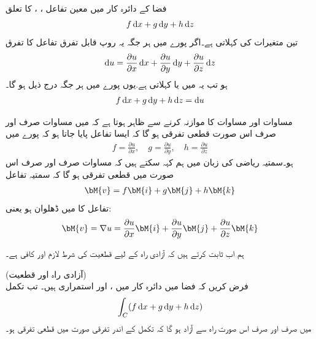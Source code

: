 فضا کے دائرہ کار  میں معین تفاعل ، ،  کا تعلق
\begin{align}\label{مساوات_خطی_تکمل_آزاد_راہ_ب}
f\dif x+g\dif y+h\dif z
\end{align}
 تین متغیرات کی  کہلاتی ہے۔اگر پورے  میں ہر جگہ  یہ روپ قابل تفرق تفاعل  کا تفرق
\begin{align}\label{مساوات_خطی_تکمل_آزاد_راہ_پ}
\dif u=\frac{\partial u}{\partial x}\dif x+\frac{\partial u}{\partial y}\dif y+\frac{\partial u}{\partial z}\dif z
\end{align}
ہو  تب یہ  میں  یا  کہلاتی ہے.یوں پورے  میں ہر جگہ درج ذیل ہو گا۔
\begin{align}\label{مساوات_خطی_تکمل_آزاد_راہ_ت}
f\dif x+g\dif y+h\dif z=\dif u
\end{align}

مساوات  اور مساوات  کا موازنہ کرنے سے ظاہر ہوتا ہے کہ  میں مساوات  صرف اور صرف اس صورت قطعی تفرقی ہو گا کہ ایسا تفاعل  پایا جاتا ہو کہ پورے  میں
\begin{align}\label{مساوات_خطی_تکمل_آزاد_راہ_ٹ}
f=\frac{\partial u}{\partial x},\quad g=\frac{\partial u}{\partial y},\quad h=\frac{\partial u}{\partial z}
\end{align}
ہو۔سمتیہ ریاضی کی زبان میں ہم کہہ سکتے ہیں کہ مساوات  صرف اور صرف اس صورت  میں قطعی تفرقی ہو گا کہ سمتیہ  تفاعل
\begin{align*}
\bM{v}=f\bM{i}+g\bM{j}+h\bM{k}
\end{align*}
تفاعل  کا  میں ڈھلوان ہو یعنی:
\begin{align}\label{مساوات_خطی_تکمل_آزاد_راہ_ث}
\bM{v}=\nabla u=\frac{\partial u}{\partial x}\bM{i}+\frac{\partial u}{\partial y}\bM{j}+\frac{\partial u}{\partial z}\bM{k}
\end{align}

ہم اب ثابت کرتے ہیں کہ آزادی راہ کے لیے  قطعیت کی شرط لازم اور کافی ہے۔

\quad (آزادی راہ اور قطعیت)\\
فرض کریں کہ فضا میں دائرہ کار  میں ،  اور   استمراری ہیں۔ تب تکمل
\begin{align}\label{مساوات_خطی_تکمل_قطعیت_آزادی_راہ_الف}
\int_C (f\dif x+g\dif y+h\dif z)
\end{align}
 میں  صرف اور صرف اس صورت راہ سے آزاد ہو گا کہ تکمل کے اندر تفرقی صورت  میں قطعی تفرقی ہو۔


